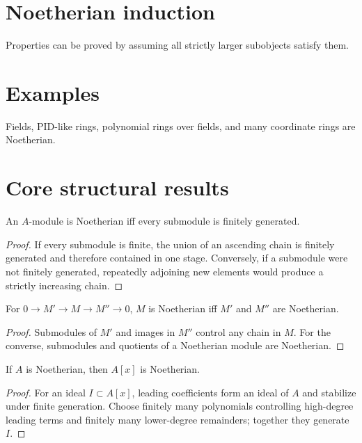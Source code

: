\section{Noetherian induction}
Properties can be proved by assuming all strictly larger subobjects satisfy them.

\section{Examples}
Fields, PID-like rings, polynomial rings over fields, and many coordinate rings are Noetherian.

\section{Core structural results}

\begin{theorem}\label{thm:v15-01}
An $A$-module is Noetherian iff every submodule is finitely generated.
\begin{proof}
If every submodule is finite, the union of an ascending chain is finitely generated and therefore contained in one stage. Conversely, if a submodule were not finitely generated, repeatedly adjoining new elements would produce a strictly increasing chain.
\end{proof}
\end{theorem}

\begin{theorem}\label{thm:v15-02}
For $0\to M'\to M\to M''\to0$, $M$ is Noetherian iff $M'$ and $M''$ are Noetherian.
\begin{proof}
Submodules of $M'$ and images in $M''$ control any chain in $M$. For the converse, submodules and quotients of a Noetherian module are Noetherian.
\end{proof}
\end{theorem}

\begin{theorem}\label{thm:v15-03}
If $A$ is Noetherian, then $A[x]$ is Noetherian.
\begin{proof}
For an ideal $I\subset A[x]$, leading coefficients form an ideal of $A$ and stabilize under finite generation. Choose finitely many polynomials controlling high-degree leading terms and finitely many lower-degree remainders; together they generate $I$.
\end{proof}
\end{theorem}

